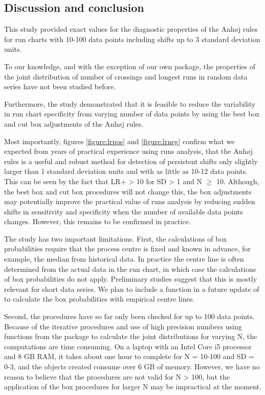 \hypertarget{discussion-and-conclusion}{%
\subsection{Discussion and conclusion}\label{discussion-and-conclusion}}

This study provided exact values for the diagnostic properties of the
Anhøj rules for run charts with 10-100 data points including shifts up
to 3 standard deviation units.

To our knowledge, and with the exception of our own 
package, the properties of the joint distribution of number of crossings
and longest runs in random data series have not been studied before.

Furthermore, the study demonstrated that it is feasible to reduce the
variability in run chart specificity from varying number of data points
by using the best box and cut box adjustments of the Anhøj rules.

Most importantly, figures \ref{figure:lrpos} and \ref{figure:lrneg}
confirm what we expected from years of practical experience using runs
analysis, that the Anhøj rules is a useful and robust method for
detection of persistent shifts only slightly larger than 1 standard
deviation units and with as little as 10-12 data points. This can be
seen by the fact that LR+ \textgreater{} 10 for SD \textgreater{} 1 and
N \(\geq\) 10. Although, the best box and cut box procedures will not
change this, the box adjustments may potentially improve the practical
value of runs analysis by reducing sudden shifts in sensitivity and
specificity when the number of available data points changes. However,
this remains to be confirmed in practice.

The study has two important limitations. First, the calculations of box
probabilities require that the process centre is fixed and known in
advance, for example, the median from historical data. In practice the
centre line is often determined from the actual data in the run chart,
in which case the calculations of box probabilities do not apply.
Preliminary studies suggest that this is mostly relevant for short data
series. We plan to include a function in a future update of
 to calculate the box probabilities with empirical
centre lines.

Second, the procedures have so far only been checked for up to 100 data
points. Because of the iterative procedures and use of high precision
numbers using functions from the  package \citep{rmpfr}
to calculate the joint distributions for varying N, the computations are
time consuming. On a laptop with an Intel Core i5 processor and 8 GB
RAM, it takes about one hour to complete  for N =
10-100 and SD = 0-3, and the objects created consume over 6 GB of
memory. However, we have no reason to believe that the procedures are
not valid for N \textgreater{} 100, but the application of the box
procedures for larger N may be impractical at the moment.

